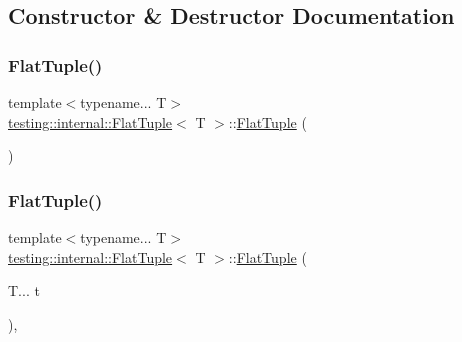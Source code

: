 \subsection{Constructor \& Destructor Documentation}
\mbox{\label{classtesting_1_1internal_1_1_flat_tuple_a056c58b5dd85f470ec5db1db9956c702}} 
\subsubsection{\texorpdfstring{FlatTuple()}{FlatTuple()}\hspace{0.1cm}{\footnotesize\ttfamily [1/4]}}
{\footnotesize\ttfamily template$<$typename... T$>$ \\
\mbox{\hyperlink{classtesting_1_1internal_1_1_flat_tuple}{testing\+::internal\+::\+Flat\+Tuple}}$<$ T $>$\+::\mbox{\hyperlink{classtesting_1_1internal_1_1_flat_tuple}{Flat\+Tuple}} (\begin{DoxyParamCaption}{ }\end{DoxyParamCaption})\hspace{0.3cm}{\ttfamily [default]}}

\mbox{\label{classtesting_1_1internal_1_1_flat_tuple_a611d01b9ff2437e4b9cfe3bbedc6d6ae}} 
\subsubsection{\texorpdfstring{FlatTuple()}{FlatTuple()}\hspace{0.1cm}{\footnotesize\ttfamily [2/4]}}
{\footnotesize\ttfamily template$<$typename... T$>$ \\
\mbox{\hyperlink{classtesting_1_1internal_1_1_flat_tuple}{testing\+::internal\+::\+Flat\+Tuple}}$<$ T $>$\+::\mbox{\hyperlink{classtesting_1_1internal_1_1_flat_tuple}{Flat\+Tuple}} (\begin{DoxyParamCaption}\item[{T...}]{t }\end{DoxyParamCaption})\hspace{0.3cm}{\ttfamily [inline]}, {\ttfamily [explicit]}}

